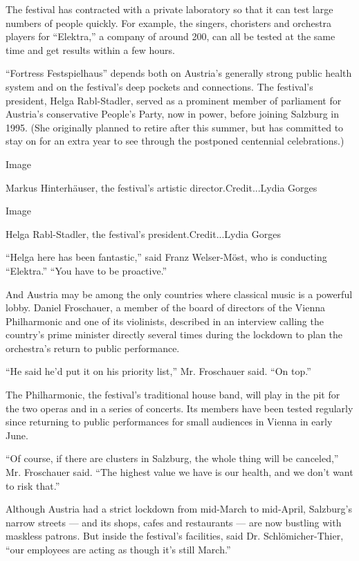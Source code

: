 The festival has contracted with a private laboratory so that it can
test large numbers of people quickly. For example, the singers,
choristers and orchestra players for ``Elektra,'' a company of around
200, can all be tested at the same time and get results within a few
hours.

``Fortress Festspielhaus'' depends both on Austria's generally strong
public health system and on the festival's deep pockets and connections.
The festival's president, Helga Rabl-Stadler, served as a prominent
member of parliament for Austria's conservative People's Party, now in
power, before joining Salzburg in 1995. (She originally planned to
retire after this summer, but has committed to stay on for an extra year
to see through the postponed centennial celebrations.)

Image

Markus Hinterhäuser, the festival's artistic director.Credit...Lydia
Gorges

Image

Helga Rabl-Stadler, the festival's president.Credit...Lydia Gorges

``Helga here has been fantastic,'' said Franz Welser-Möst, who is
conducting ``Elektra.'' ``You have to be proactive.''

And Austria may be among the only countries where classical music is a
powerful lobby. Daniel Froschauer, a member of the board of directors of
the Vienna Philharmonic and one of its violinists, described in an
interview calling the country's prime minister directly several times
during the lockdown to plan the orchestra's return to public
performance.

``He said he'd put it on his priority list,'' Mr. Froschauer said. ``On
top.''

The Philharmonic, the festival's traditional house band, will play in
the pit for the two operas and in a series of concerts. Its members have
been tested regularly since returning to public performances for small
audiences in Vienna in early June.

``Of course, if there are clusters in Salzburg, the whole thing will be
canceled,'' Mr. Froschauer said. ``The highest value we have is our
health, and we don't want to risk that.''

Although Austria had a strict lockdown from mid-March to mid-April,
Salzburg's narrow streets --- and its shops, cafes and restaurants ---
are now bustling with maskless patrons. But inside the festival's
facilities, said Dr. Schlömicher-Thier, ``our employees are acting as
though it's still March.''

